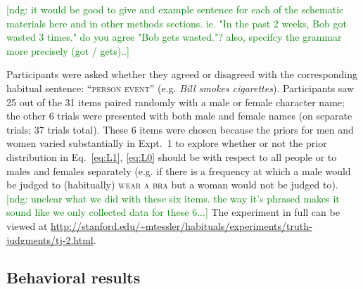 \documentclass[10pt,letterpaper]{article}
\newcommand{\ndg}[1]{\textcolor{Green}{[ndg: #1]}}
\begin{document}
\ndg{it would be good to give and example sentence for each of the schematic materials here and in other methods sections. ie. "In the past 2 weeks, Bob got wasted 3 times." do you agree "Bob gets wasted."?
also, specifcy the grammar more precisely (got / gets)..}

Participants were asked whether they agreed or disagreed with the corresponding habitual sentence: ``\textsc{person event}'' (e.g. \emph{Bill smokes cigarettes}).
Participants saw 25 out of the 31 items paired randomly with a male or female character name; the other 6 trials were presented with both male and female names (on separate trials; 37 trials total).  
These 6 items were chosen because the priors for men and women varied substantially in Expt.~1 to explore whether or not the prior distribution in Eq.~\ref{eq:L1}, \ref{eq:L0} should be with respect to all people or to males and females separately (e.g. if there is a frequency at which a male would be judged to (habitually) \textsc{wear a bra} but a woman would not be judged to). 
\ndg{unclear what we did with these six items. the way it's phrased makes it sound like we only collected data for these 6...}
The experiment in full can be viewed at \url{http://stanford.edu/~mtessler/habituals/experiments/truth-judgments/tj-2.html}.



\subsection{Behavioral results}
\end{document}

